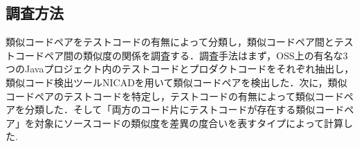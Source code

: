 \documentclass{fose2019}           %
\begin{document}
\subsection{調査方法}
類似コードペアをテストコードの有無によって分類し，類似コードペア間とテストコードペア間の類似度の関係を調査する．調査手法はまず，OSS上の有名な3つのJavaプロジェクト内のテストコードとプロダクトコードをそれぞれ抽出し，類似コード検出ツールNICADを用いて類似コードペアを検出した\cite{ICPC}．次に，類似コードペアのテストコードを特定し，テストコードの有無によって類似コードペアを分類した．そして「両方のコード片にテストコードが存在する類似コードペア」を対象にソースコードの類似度を差異の度合いを表すタイプ\cite{SCP}によって計算した.

\end{document}
